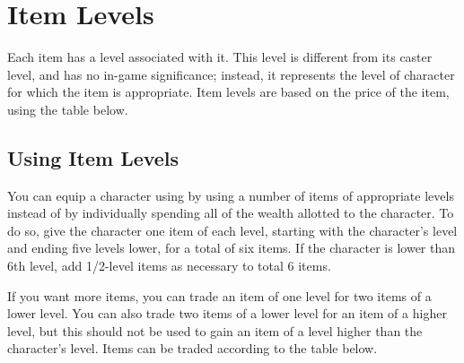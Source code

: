 \section{Item Levels}

Each item has a level associated with it. This level is different from its caster level, and has no in-game significance; instead, it represents the level of character for which the item is appropriate. Item levels are based on the price of the item, using the table below.

\subsection{Using Item Levels}

You can equip a character using by using a number of items of appropriate levels instead of by individually spending all of the wealth allotted to the character. To do so, give the character one item of each level, starting with the character's level and ending five levels lower, for a total of six items. If the character is lower than 6th level, add 1/2-level items as necessary to total 6 items.

If you want more items, you can trade an item of one level for two items of a lower level. You can also trade two items of a lower level for an item of a higher level, but this should not be used to gain an item of a level higher than the character's level. Items can be traded according to the table below.

